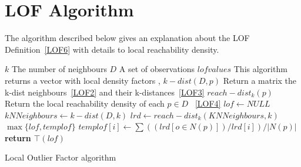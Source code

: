 \section{LOF Algorithm}
The algorithm described below \citep{Malak} gives an explanation about the LOF Definition~\ref{LOF6} with details to local reachability density.
\begin{algorithm}[H]
  \begin{algorithmic}[1]
  \INPUT{}  
  \Statex $k$ \Comment The number of neighbours
  \Statex $D$  \Comment A set of observations
  \OUTPUT{}  
    \Statex $lof values$ \Comment This algorithm returns a vector with local density factors
   \ASSUME,  
   \Statex $k-dist(D,p)$ \Comment Return a matrix the k-dist neighbours~\ref{LOF2} and their k-distances~\ref{LOF3}
   \Statex $reach-dist_k(p)$  \Comment Return the local reachability density of each $p \in D$ ~\ref{LOF4}    
    \State $lof \gets NULL$       
              \State $kNNeighbours \gets k-dist(D,k)$
              \State $lrd \gets reach-dist_k(KNNeighbours,k)$        
			             \State $\max \lbrace lof,templof \rbrace$ 
		                 \State $templof[i] \gets \sum ((lrd[o \in N(p)]) / lrd[i])/ |N(p)|$
                   \EndFor\label{loffor}        
            \EndFor\label{loffor}    
    \State \textbf{return} $\top(lof)$
    \EndProcedure
  \end{algorithmic}
  \caption{Local Outlier Factor algorithm}\label{lof}
\end{algorithm}
     \begin{comment}    
    \FOR{each point $p$}\Comment{We have the answer if r is 0}
      \State $kNNeighbours \gets k-dist(D,k)$
      \State $lrd \gets reach-dist_k(KNNeighbours,k)$

     \FOR{each $p$ in kNNeigbours}
               \State $templof[i] \gets \sum ((lrd[o \in N(p)]) / lrd[i])/ |N(p)|$
               \State $\max \lbrace lof,templof \rbrace$
           \EndFor\label{loffor}

    \EndFor\label{loffor}
     \end{comment}  
